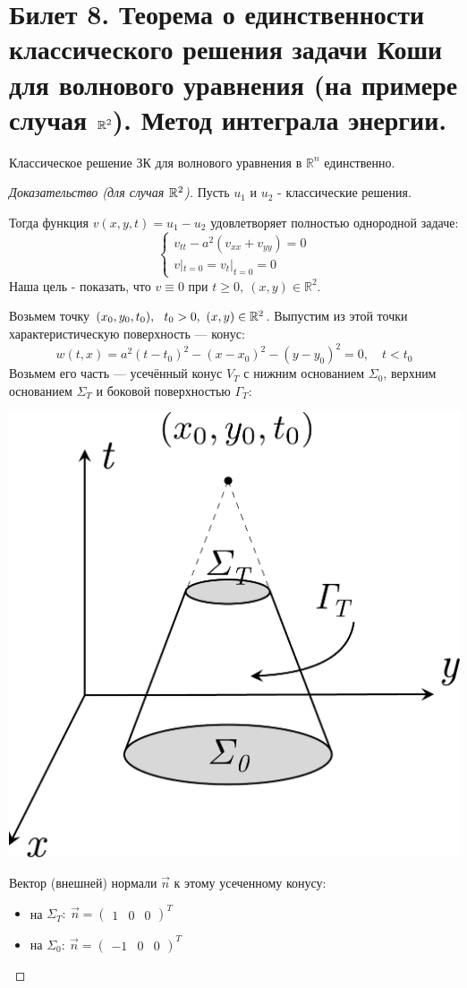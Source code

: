 \documentclass[../main.tex]{subfiles}
\begin{document}
\section{Билет 8. Теорема о единственности классического решения задачи Коши для волнового уравнения (на примере случая \texorpdfstring{$\mathbb{R}^2$}{R\textasciicircum 2}). Метод интеграла энергии.}


\begin{theorem} Классическое решение ЗК для волнового уравнения в $\mathbb{R}^n$ единственно.
\end{theorem}
\begin{proof}[Доказательство (для случая $\mathbb{R}^2$)]
Пусть $u_{1}$ и $u_{2}$ - классические решения.

Тогда функция $v(x,y,t) = u_1 - u_2$ удовлетворяет полностью однородной задаче: 
$$
\begin{cases}
  v_{tt} - a^2(v_{xx} + v_{yy}) = 0\\
  v|_{t=0} = v_t|_{t=0} = 0
\end{cases}
$$
Наша цель - показать, что $v\equiv 0 $ при $ t\geq 0,\ (x,y) \in \mathbb{R}^2$.

Возьмем точку $ (x_0, y_0, t_0),\ \ t_0 > 0,\ (x,y) \in \mathbb{R}^2$. \; Выпустим из этой точки характеристическую поверхность --- конус:
$$ 
w(t,x) = a^2(t - t_0)^2 - (x - x_0)^2 - (y - y_0)^2 = 0,\quad t < t_0
$$
Возьмем его часть --- усечённый конус $ V_T $ с нижним основанием $ \Sigma_0 $, верхним основанием $ \Sigma_T $  и боковой поверхностью $ \Gamma_T:$
\begin{center}
\includegraphics[width=0.28\linewidth]{./pic 8.pdf}
\end{center}
Вектор (внешней) нормали $ \vec{n} $ к этому усеченному конусу:
\begin{itemize}
	\item на $\Sigma_T:\ \vec{n} = \begin{pmatrix}1 & 0 & 0\end{pmatrix}^T $
	
	\item на $\Sigma_0:\ \vec{n} = \begin{pmatrix}-1 & 0 & 0\end{pmatrix}^T $
	

\end{itemize}
\end{proof}
\end{document}
